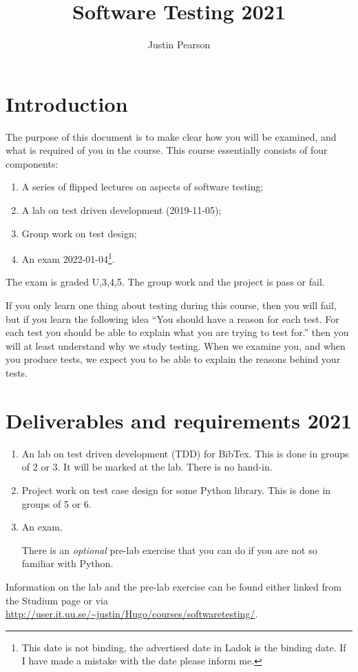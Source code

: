 \documentclass[a4paper]{article}
\title{Software Testing 2021}
\author{Justin Pearson }
\begin{document}
\maketitle
\def\UrlBreaks{\do\/\do-} 

\section{Introduction}
The purpose of this document is to make clear how you will be examined, and
what is required of you in the course.  This course essentially consists of
four components:
\begin{enumerate}
\item A series of flipped lectures on aspects of software testing;
 \item A lab on test driven development (2019-11-05);
\item Group work on test design;
\item An exam 2022-01-04\footnote{This date is not binding, the
    advertised date in Ladok is the binding date. If I have made a
    mistake with the date please inform me.}. 
\end{enumerate}
The exam is graded U,3,4,5. The group work and the project is pass or fail.

If you only learn one thing about testing during this course, then you
will fail, but if you learn the following idea ``You should have a
reason for each test. For each test you should be able to explain what
you are trying to test for.'' then you will at least understand why we
study testing. When we examine you, and when you produce tests, we
expect you to be able to explain the reasons behind your tests.


\section{Deliverables and requirements  2021}



\begin{enumerate}
\item An lab on  test driven development (TDD) for  BibTex.   This is
  done in groups of 2 or 3. It will be marked at the lab. There is no
  hand-in. 
\item Project work on test case design for some Python library. This
  is done in groups of 5 or 6.
\item An exam.

There is an {\em optional} pre-lab exercise that you can do if you are
not so familiar with Python.  


  
  
  \end{enumerate}
  Information on the lab and the pre-lab exercise can be found either
  linked from the Studium page or via
  \url{http://user.it.uu.se/~justin/Hugo/courses/softwaretesting/}.
\end{document}
